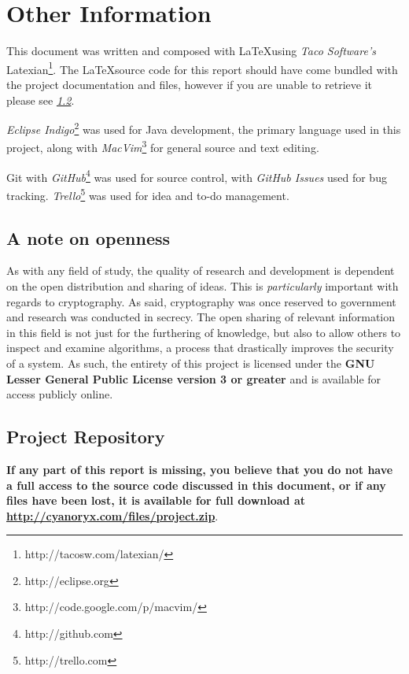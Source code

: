 \section{Other Information}

This document was written and composed with \LaTeX using \emph{Taco Software's} Latexian\footnote{http://tacosw.com/latexian/}. The \LaTeX source code for this report should have come bundled with the project documentation and files, however if you are unable to retrieve it please see \emph{\textsection \ref{sec:project_repo}}.

\emph{Eclipse Indigo}\footnote{http://eclipse.org} was used for Java development, the primary language used in this project, along with \emph{MacVim}\footnote{http://code.google.com/p/macvim/} for general source and text editing.

Git with \emph{GitHub}\footnote{http://github.com} was used for source control, with \emph{GitHub Issues} used for bug tracking. \emph{Trello}\footnote{http://trello.com} was used for idea and to-do management.

\subsection{A note on openness}

As with any field of study, the quality of research and development is dependent on the open distribution and sharing of ideas. This is \emph{particularly} important with regards to cryptography. As said, cryptography was once reserved to government and research was conducted in secrecy. The open sharing of relevant information in this field is not just for the furthering of knowledge, but also to allow others to inspect and examine algorithms, a process that drastically improves the security of a system. As such, the entirety of this project is licensed under the \textbf{GNU Lesser General Public License version 3 or greater} and is available for access publicly online.

\subsection{Project Repository}
\label{sec:project_repo}

\textbf{If any part of this report is missing, you believe that you do not have a full access to the source code discussed in this document, or if any files have been lost, it is available for full download at \url{http://cyanoryx.com/files/project.zip}}. 